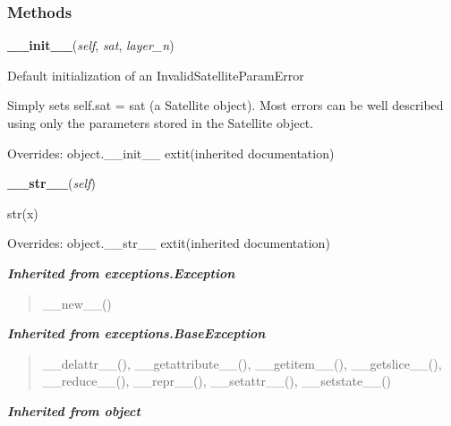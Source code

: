   \subsubsection{Methods}

    \vspace{0.5ex}

\hspace{.8\funcindent}\begin{boxedminipage}{\funcwidth}

    \raggedright \textbf{\_\_init\_\_}(\textit{self}, \textit{sat}, \textit{layer\_n})

\setlength{\parskip}{2ex}
    Default initialization of an InvalidSatelliteParamError

    Simply sets self.sat = sat (a Satellite object).  Most errors can be 
    well described using only the parameters stored in the Satellite 
    object.

\setlength{\parskip}{1ex}
      Overrides: object.\_\_init\_\_ 	extit{(inherited documentation)}

    \end{boxedminipage}

    \vspace{0.5ex}

\hspace{.8\funcindent}\begin{boxedminipage}{\funcwidth}

    \raggedright \textbf{\_\_str\_\_}(\textit{self})

\setlength{\parskip}{2ex}
    str(x)

\setlength{\parskip}{1ex}
      Overrides: object.\_\_str\_\_ 	extit{(inherited documentation)}

    \end{boxedminipage}


\large{\textbf{\textit{Inherited from exceptions.Exception}}}

\begin{quote}
\_\_new\_\_()
\end{quote}

\large{\textbf{\textit{Inherited from exceptions.BaseException}}}

\begin{quote}
\_\_delattr\_\_(), \_\_getattribute\_\_(), \_\_getitem\_\_(), \_\_getslice\_\_(), \_\_reduce\_\_(), \_\_repr\_\_(), \_\_setattr\_\_(), \_\_setstate\_\_()
\end{quote}

\large{\textbf{\textit{Inherited from object}}}


